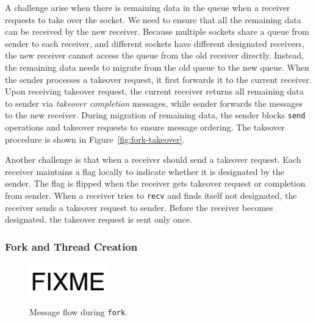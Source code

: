 A challenge arise when there is remaining data in the queue when a receiver requests to take over the socket. We need to ensure that all the remaining data can be received by the new receiver. Because multiple sockets share a queue from sender to each receiver, and different sockets have different designated receivers, the new receiver cannot access the queue from the old receiver directly. Instead, the remaining data needs to migrate from the old queue to the new queue. When the sender processes a takeover request, it first forwards it to the current receiver. Upon receiving takeover request, the current receiver returns all remaining data to sender via \textit{takeover completion} messages, while sender forwards the messages to the new receiver. During migration of remaining data, the sender blocks \texttt{send} operations and takeover requests to ensure message ordering. The takeover procedure is shown in Figure~\ref{fig:fork-takeover}.

Another challenge is that when a receiver should send a takeover request. Each receiver maintains a flag locally to indicate whether it is designated by the sender. The flag is flipped when the receiver gets takeover request or completion from sender. When a receiver tries to \texttt{recv} and finds itself not designated, the receiver sends a takeover request to sender. Before the receiver becomes designated, the takeover request is sent only once.


\subsubsection{Fork and Thread Creation}
\label{subsubsec:fork_fork}


\begin{figure}[t]
	\centering
	\includegraphics[width=0.3\textwidth]{images/fixme}
	\caption{Message flow during \texttt{fork}.}
	\label{fig:fork-fork}
\end{figure}


